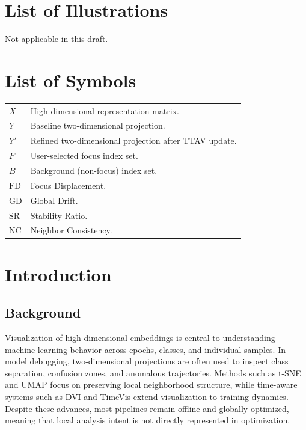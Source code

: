 \documentclass[12pt,a4paper]{report}
\begin{document}
\listoftables
\listoffigures
\chapter*{List of Illustrations}
Not applicable in this draft.

\chapter*{List of Symbols}
\begin{tabular}{p{}p{}}
\(X\) & High-dimensional representation matrix. \\
\(Y\) & Baseline two-dimensional projection. \\
\(Y'\) & Refined two-dimensional projection after TTAV update. \\
\(F\) & User-selected focus index set. \\
\(B\) & Background (non-focus) index set. \\
\(\mathrm{FD}\) & Focus Displacement. \\
\(\mathrm{GD}\) & Global Drift. \\
\(\mathrm{SR}\) & Stability Ratio. \\
\(\mathrm{NC}\) & Neighbor Consistency. \\
\end{tabular}

\cleardoublepage
{}
\setcounter{page}{1}

\chapter{Introduction}
\section{Background}
Visualization of high-dimensional embeddings is central to understanding machine learning behavior across epochs, classes, and individual samples. In model debugging, two-dimensional projections are often used to inspect class separation, confusion zones, and anomalous trajectories. Methods such as t-SNE and UMAP focus on preserving local neighborhood structure, while time-aware systems such as DVI and TimeVis extend visualization to training dynamics. Despite these advances, most pipelines remain offline and globally optimized, meaning that local analysis intent is not directly represented in optimization.
\end{document}
